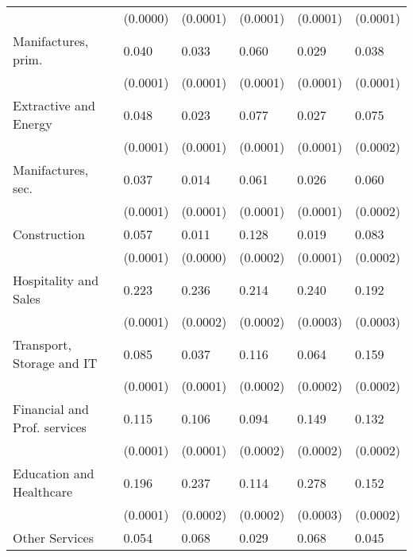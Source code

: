 \begin{tabular}{llllll}
                             &  (0.0000) &  (0.0001) &  (0.0001) &           (0.0001) &         (0.0001) \\
Manifactures, prim.          &     0.040 &     0.033 &     0.060 &              0.029 &            0.038 \\
                             &  (0.0001) &  (0.0001) &  (0.0001) &           (0.0001) &         (0.0001) \\
Extractive and Energy        &     0.048 &     0.023 &     0.077 &              0.027 &            0.075 \\
                             &  (0.0001) &  (0.0001) &  (0.0001) &           (0.0001) &         (0.0002) \\
Manifactures, sec.           &     0.037 &     0.014 &     0.061 &              0.026 &            0.060 \\
                             &  (0.0001) &  (0.0001) &  (0.0001) &           (0.0001) &         (0.0002) \\
Construction                 &     0.057 &     0.011 &     0.128 &              0.019 &            0.083 \\
                             &  (0.0001) &  (0.0000) &  (0.0002) &           (0.0001) &         (0.0002) \\
Hospitality and Sales        &     0.223 &     0.236 &     0.214 &              0.240 &            0.192 \\
                             &  (0.0001) &  (0.0002) &  (0.0002) &           (0.0003) &         (0.0003) \\
Transport, Storage and IT    &     0.085 &     0.037 &     0.116 &              0.064 &            0.159 \\
                             &  (0.0001) &  (0.0001) &  (0.0002) &           (0.0002) &         (0.0002) \\
Financial and Prof. services &     0.115 &     0.106 &     0.094 &              0.149 &            0.132 \\
                             &  (0.0001) &  (0.0001) &  (0.0002) &           (0.0002) &         (0.0002) \\
Education and Healthcare     &     0.196 &     0.237 &     0.114 &              0.278 &            0.152 \\
                             &  (0.0001) &  (0.0002) &  (0.0002) &           (0.0003) &         (0.0002) \\
Other Services               &     0.054 &     0.068 &     0.029 &              0.068 &            0.045 \\

\end{tabular}
